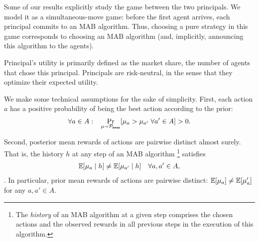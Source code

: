 
Some of our results explicitly study the game between the two principals. We model it as a simultaneous-move game: before the first agent arrives, each principal commits to an MAB algorithm. Thus, choosing a pure strategy in this game corresponds to choosing an MAB algorithm (and, implicitly, announcing this algorithm to the agents).

Principal's utility is primarily defined as the market share, \ie the number of agents that chose this principal. Principals are risk-neutral, in the sense that they optimize their expected utility.

 We make some technical assumptions for the sake of simplicity. First, each action $a$ has a positive probability of being the best action according to the prior:
\begin{align}\label{eq:assn-prob}
\forall a\in A:\;\;\;  \Pr_{\mu\sim \mathcal{P}_\mathtt{mean}}[\mu_a  > \mu_{a'}
\;\forall a'\in A]
> 0.
\end{align}

Second, posterior mean rewards of actions are pairwise distinct almost
surely. That is, the history $h$ at any step of an MAB algorithm%
\footnote{The \emph{history} of an MAB algorithm at a given step
  comprises the chosen actions and the observed rewards in all
  previous steps in the execution of this algorithm.}
 satisfies
\begin{align}\label{eq:assn-distinct}
    \E[\mu_a \mid h] \neq \E[\mu_{a'}\mid h] \quad \forall a,a'\in A,
\end{align}
.  In
particular, prior mean rewards of actions are pairwise distinct:
$\E[\mu_a] \neq \E[\mu_a']$ for any $a,a'\in A$. 

